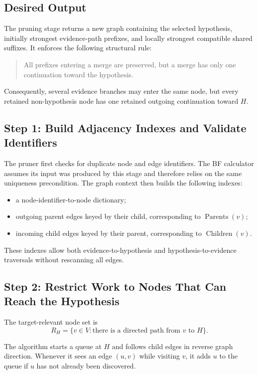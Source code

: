 \documentclass[11pt]{article}
\newcommand{\Parents}{\operatorname{Parents}}
\newcommand{\Children}{\operatorname{Children}}
\begin{document}
\subsection{Desired Output}

The pruning stage returns a new graph containing the selected hypothesis,
initially strongest evidence-path prefixes, and locally strongest compatible
shared suffixes.  It enforces the following structural rule:

\begin{quote}
All prefixes entering a merge are preserved, but a merge has only one
continuation toward the hypothesis.
\end{quote}

Consequently, several evidence branches may enter the same node, but every
retained non-hypothesis node has one retained outgoing continuation toward
\(H\).

\subsection{Step 1: Build Adjacency Indexes and Validate Identifiers}

The pruner first checks for duplicate node and edge identifiers.  The BF
calculator assumes its input was produced by this stage and therefore relies
on the same uniqueness precondition.  The graph context then builds the
following indexes:

\begin{itemize}
    \item a node-identifier-to-node dictionary;
    \item outgoing parent edges keyed by their child, corresponding to
          \(\Parents(v)\);
    \item incoming child edges keyed by their parent, corresponding to
          \(\Children(v)\).
\end{itemize}

These indexes allow both evidence-to-hypothesis and hypothesis-to-evidence
traversals without rescanning all edges.

\subsection{Step 2: Restrict Work to Nodes That Can Reach the Hypothesis}

The target-relevant node set is
\[
    R_H
      = \{v\in V : \text{there is a directed path from \(v\) to \(H\)}\}.
\]

The algorithm starts a queue at \(H\) and follows child edges in reverse graph
direction.  Whenever it sees an edge \((u,v)\) while visiting \(v\), it adds
\(u\) to the queue if \(u\) has not already been discovered.
\end{document}
